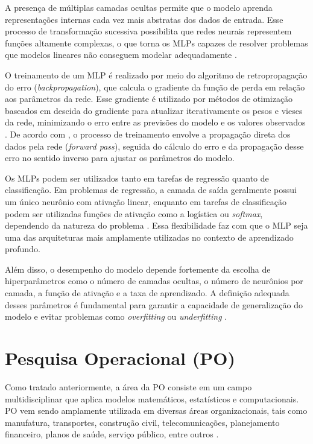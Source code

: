 A presença de múltiplas camadas ocultas permite que o modelo aprenda representações internas cada vez mais abstratas dos dados de entrada. 
Esse processo de transformação sucessiva possibilita que redes neurais representem funções altamente complexas, o que torna os MLPs capazes de resolver 
problemas que modelos lineares não conseguem modelar adequadamente \cite{Goodfellow2016,Geron2019}.

O treinamento de um MLP é realizado por meio do algoritmo de retropropagação do erro (\textit{backpropagation}), que calcula o gradiente da função de perda 
em relação aos parâmetros da rede. Esse gradiente é utilizado por métodos de otimização baseados em descida do gradiente para atualizar iterativamente os pesos 
e vieses da rede, minimizando o erro entre as previsões do modelo e os valores observados \cite{Goodfellow2016}. 
De acordo com \cite{Geron2019}, o processo de treinamento envolve a propagação direta dos dados pela rede (\textit{forward pass}), seguida do cálculo do erro 
e da propagação desse erro no sentido inverso para ajustar os parâmetros do modelo.

Os MLPs podem ser utilizados tanto em tarefas de regressão quanto de classificação. Em problemas de regressão, a camada de saída geralmente possui um único neurônio 
com ativação linear, enquanto em tarefas de classificação podem ser utilizadas funções de ativação como a logística ou \textit{softmax}, dependendo da natureza do problema 
\cite{Geron2019}. Essa flexibilidade faz com que o MLP seja uma das arquiteturas mais amplamente utilizadas no contexto de aprendizado profundo.

Além disso, o desempenho do modelo depende fortemente da escolha de hiperparâmetros como o número de camadas ocultas, o número de neurônios por camada, a função de ativação 
e a taxa de aprendizado. A definição adequada desses parâmetros é fundamental para garantir a capacidade de generalização do modelo e evitar problemas como 
\textit{overfitting} ou \textit{underfitting} \cite{Geron2019}.

\section{Pesquisa Operacional (PO)}

Como tratado anteriormente, a área da PO consiste em um campo multidisciplinar que aplica modelos matemáticos, estatísticos e computacionais. 
PO vem sendo amplamente utilizada em diversas áreas organizacionais, tais como manufatura, transportes, construção civil, telecomunicações, 
planejamento financeiro, planos de saúde, serviço público, entre outros \cite{Hillier2001}.


